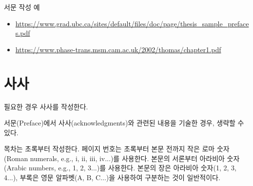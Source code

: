 \documentclass[11pt]{report}
\begin{document}
\bigskip
서문 작성 예
\begin{itemize}
\item\url{https://www.grad.ubc.ca/sites/default/files/doc/page/thesis_sample_prefaces.pdf}
\item\url{https://www.phase-trans.msm.cam.ac.uk/2002/thomas/chapter1.pdf}
\end{itemize}

\newpage
{}
\chapter*{사사}

\normalsize
필요한 경우 사사를 작성한다. \par
서문(Preface)에서 사사(acknowledgments)와 관련된 내용을 기술한 경우, 생략할 수 있다.

\newpage
\renewcommand*\contentsname{목차}
\tableofcontents


\vspace{2cm}

목차는 초록부터 작성한다.
페이지 번호는 초록부터 본문 전까지 작은 로마 숫자(Roman numerals, e.g., i, ii, iii, iv...)를 사용한다. 본문의 서론부터 아라비아 숫자(Arabic numbers, e.g., 1, 2, 3...)를 사용한다. 
본문의 장은 아라비아 숫자(1, 2, 3, 4...), 부록은 영문 알파벳(A, B, C...)을 사용하여 구분하는 것이 일반적이다.

\renewcommand{\listtablename}{표 목차}
\listoftables


\renewcommand{\listfigurename}{그림 목차}
\listoffigures

\end{document}
